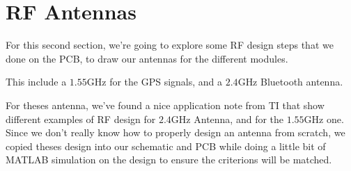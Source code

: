\section{RF Antennas}
For this second section, we're going to explore some RF design steps that we done on the PCB,
to draw our antennas for the different modules.

This include a $1.55 \si{\giga\hertz}$ for the GPS signals, and a $2.4 \si{\giga\hertz}$
Bluetooth antenna.

For theses antenna, we've found a nice application note from TI \cite{InvertedF} that
show different examples of RF design for $2.4 \si{\giga\hertz}$  Antenna, and \cite{GNSS}
for the $1.55 \si{\giga\hertz}$ one. Since we don't really know how to properly design an
antenna from scratch, we copied theses design into our schematic and PCB while doing a
little bit of MATLAB simulation on the design to ensure the criterions will be matched.